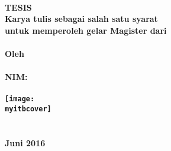 \thispagestyle{empty}
\begin{singlespacing}
\begin{center}
\textbf{\large
	\MakeUppercase{\judul} \\
	\vfill
	TESIS \\
	\bigskip
	{\normalsize
		Karya tulis sebagai salah satu syarat \\
		untuk memperoleh gelar Magister dari \\
		\itb{} \\
	}
	\vfill
	{\normalsize Oleh} \\
	\MakeUppercase{\myname{}} \\
	NIM: \mysid{} \\
	\mydept{} \\
	\vfill
	\texttt{[image: \\myitbcover]} \\
	\vfill
	\normalsize
	\MakeUppercase{\tfakultas} \\
	\MakeUppercase{\itb{}} \\
	Juni 2016 \\
}
\end{center}
\end{singlespacing}
